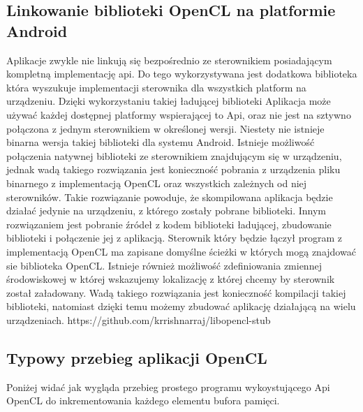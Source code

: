 \subsection{Linkowanie biblioteki OpenCL na platformie Android}
Aplikacje zwykle nie linkują się bezpośrednio ze sterownikiem posiadającym kompletną implementację api. Do tego wykorzystywana jest dodatkowa biblioteka która wyszukuje implementacji sterownika dla wszystkich platform na urządzeniu. Dzięki wykorzystaniu takiej ładującej biblioteki Aplikacja może używać każdej dostępnej platformy wspierającej to Api, oraz nie jest na sztywno połączona z jednym sterownikiem w określonej wersji.
Niestety nie istnieje binarna wersja takiej biblioteki dla systemu Android. Istnieje możliwość połączenia natywnej biblioteki ze sterownikiem znajdującym się w urządzeniu, jednak wadą takiego rozwiązania jest konieczność pobrania z urządzenia pliku binarnego z implementacją OpenCL oraz wszystkich zależnych od niej sterowników. Takie rozwiązanie powoduje, że skompilowana aplikacja będzie działać jedynie na urządzeniu, z którego zostały pobrane biblioteki.
Innym rozwiązaniem jest pobranie źródeł z kodem biblioteki ładującej, zbudowanie biblioteki i połączenie jej z aplikacją. Sterownik który będzie łączył program z implementacją OpenCL ma zapisane domyślne ścieżki w których mogą znajdować sie biblioteka OpenCL. Istnieje również możliwość zdefiniowania zmiennej środowiskowej w której wskazujemy lokalizację z której chcemy by sterownik został załadowany. Wadą takiego rozwiązania jest konieczność kompilacji takiej biblioteki, natomiast dzięki temu możemy zbudować aplikację działającą na wielu urządzeniach.
https://github.com/krrishnarraj/libopencl-stub

\subsection{Typowy przebieg aplikacji OpenCL}
Poniżej widać jak wygląda przebieg prostego programu wykoystującego Api OpenCL do inkrementowania każdego elementu bufora pamięci.



